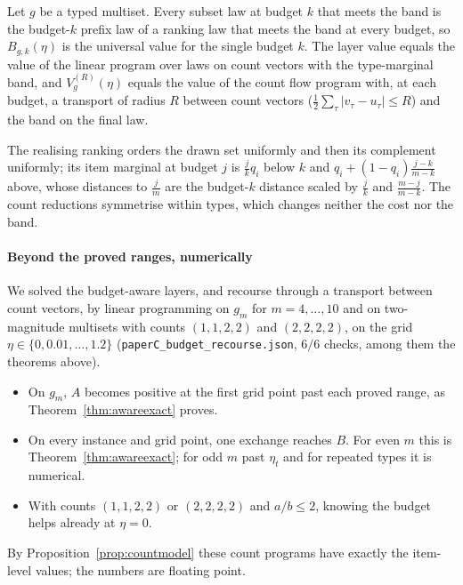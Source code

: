 \begin{proposition}
\label{prop:countmodel}
Let $g$ be a typed multiset. Every subset law at budget $k$ that meets the band is the budget-$k$
prefix law of a ranking law that meets the band at every budget, so $B_{g,k}(\eta)$ is the universal
value for the single budget $k$. The layer value equals the value of the linear program over laws
on count vectors with the type-marginal band, and $V^{(R)}_g(\eta)$ equals the value of the count
flow program with, at each budget, a transport of radius $R$ between count vectors
($\frac12\sum_\tau|v_\tau-u_\tau|\le R$) and the band on the final law.
\end{proposition}

The realising ranking orders the drawn set uniformly and then its complement uniformly; its item
marginal at budget $j$ is $\frac jk q_i$ below $k$ and $q_i+(1-q_i)\frac{j-k}{m-k}$ above, whose
distances to $\frac jm$ are the budget-$k$ distance scaled by $\frac jk$ and $\frac{m-j}{m-k}$. The count
reductions symmetrise within types, which changes neither the cost nor the band.

\paragraph{Beyond the proved ranges, numerically} \NUM{} We solved the budget-aware layers, and
recourse through a transport between count vectors, by linear programming on $g_m$ for
$m=4,\dots,10$ and on two-magnitude multisets with counts $(1,1,2,2)$ and $(2,2,2,2)$, on the
grid $\eta\in\{0,0.01,\dots,1.2\}$ (\texttt{paperC\_budget\_recourse.json}, $6/6$ checks, among them the theorems above).
\begin{itemize}
\item On $g_m$, $A$ becomes positive at the first grid point past each proved range, as
Theorem~\ref{thm:awareexact} proves.
\item On every instance and grid point, one exchange reaches $B$. For even $m$ this is
Theorem~\ref{thm:awareexact}; for odd $m$ past $\eta_t$ and for repeated types it is numerical.
\item With counts $(1,1,2,2)$ or $(2,2,2,2)$ and $a/b\le2$, knowing the budget helps already at
$\eta=0$.
\end{itemize}
By Proposition~\ref{prop:countmodel} these count programs have exactly the item-level values; the
numbers are floating point.

